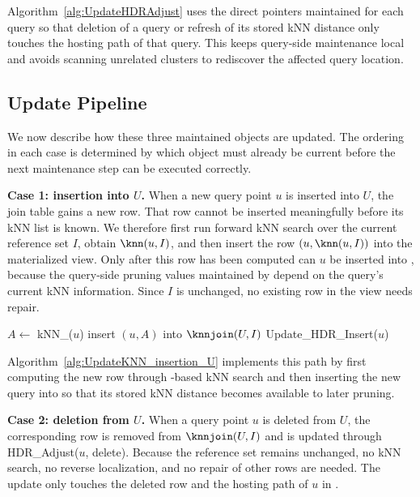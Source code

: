 Algorithm~\ref{alg:UpdateHDRAdjust} uses the direct pointers maintained for each query so that deletion of a query or refresh of its stored kNN distance only touches the hosting path of that query. This keeps query-side maintenance local and avoids scanning unrelated clusters to rediscover the affected query location.

\subsection{Update Pipeline}
\label{subsec:pipeline}

We now describe how these three maintained objects are updated. The ordering in each case is determined by which object must already be current before the next maintenance step can be executed correctly.

\noindent \textbf{Case 1: insertion into $U$.}
When a new query point $u$ is inserted into $U$, the join table gains a new row. That row cannot be inserted meaningfully before its kNN list is known. We therefore first run forward kNN search over the current reference set $I$, obtain $\knn(u,I)$, and then insert the row $(u,\knn(u,I))$ into the materialized view. Only after this row has been computed can $u$ be inserted into \hdrtree, because the query-side pruning values maintained by \hdrtree depend on the query's current kNN information. Since $I$ is unchanged, no existing row in the view needs repair.

\begin{algorithm}[t]
\caption{$\knnjoin$\_Insertion\_U($u$)}
\label{alg:UpdateKNN_insertion_U}
$A\leftarrow$ kNN\_\dualtree($u$)\;
insert $(u,A)$ into $\knnjoin(U,I)$\;
Update\_HDR\_Insert($u$)\;
\end{algorithm}

Algorithm~\ref{alg:UpdateKNN_insertion_U} implements this path by first computing the new row through \deltatree-based kNN search and then inserting the new query into \hdrtree so that its stored kNN distance becomes available to later pruning.

\noindent \textbf{Case 2: deletion from $U$.}
When a query point $u$ is deleted from $U$, the corresponding row is removed from $\knnjoin(U,I)$ and \hdrtree is updated through HDR\_Adjust($u$, delete). Because the reference set remains unchanged, no kNN search, no reverse localization, and no repair of other rows are needed. The update only touches the deleted row and the hosting path of $u$ in \hdrtree.

